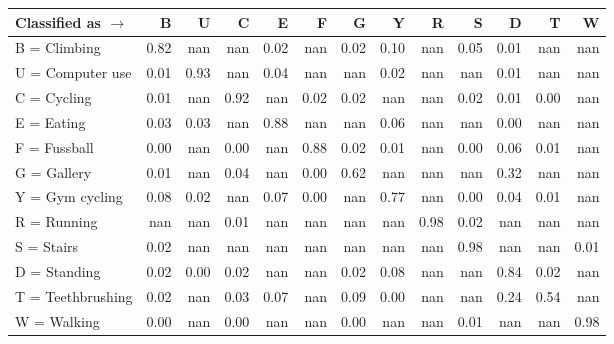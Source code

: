 \begin{tabular}{lrrrrrrrrrrrr}
\toprule
Classified as $\rightarrow$ &    B &    U &    C &    E &    F &    G &    Y &    R &    S &    D &    T &    W \\
\midrule
B = Climbing      & 0.82 &  nan &  nan & 0.02 &  nan & 0.02 & 0.10 &  nan & 0.05 & 0.01 &  nan &  nan \\
U = Computer use  & 0.01 & 0.93 &  nan & 0.04 &  nan &  nan & 0.02 &  nan &  nan & 0.01 &  nan &  nan \\
C = Cycling       & 0.01 &  nan & 0.92 &  nan & 0.02 & 0.02 &  nan &  nan & 0.02 & 0.01 & 0.00 &  nan \\
E = Eating        & 0.03 & 0.03 &  nan & 0.88 &  nan &  nan & 0.06 &  nan &  nan & 0.00 &  nan &  nan \\
F = Fussball      & 0.00 &  nan & 0.00 &  nan & 0.88 & 0.02 & 0.01 &  nan & 0.00 & 0.06 & 0.01 &  nan \\
G = Gallery       & 0.01 &  nan & 0.04 &  nan & 0.00 & 0.62 &  nan &  nan &  nan & 0.32 &  nan &  nan \\
Y = Gym cycling   & 0.08 & 0.02 &  nan & 0.07 & 0.00 &  nan & 0.77 &  nan & 0.00 & 0.04 & 0.01 &  nan \\
R = Running       &  nan &  nan & 0.01 &  nan &  nan &  nan &  nan & 0.98 & 0.02 &  nan &  nan &  nan \\
S = Stairs        & 0.02 &  nan &  nan &  nan &  nan &  nan &  nan &  nan & 0.98 &  nan &  nan & 0.01 \\
D = Standing      & 0.02 & 0.00 & 0.02 &  nan &  nan & 0.02 & 0.08 &  nan &  nan & 0.84 & 0.02 &  nan \\
T = Teethbrushing & 0.02 &  nan & 0.03 & 0.07 &  nan & 0.09 & 0.00 &  nan &  nan & 0.24 & 0.54 &  nan \\
W = Walking       & 0.00 &  nan & 0.00 &  nan &  nan & 0.00 &  nan &  nan & 0.01 &  nan &  nan & 0.98 \\
\bottomrule
\end{tabular}

